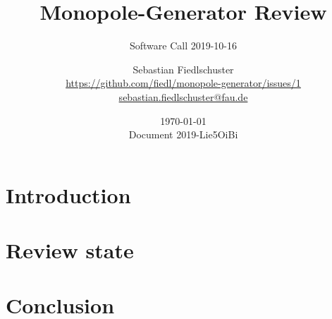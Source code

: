 \documentclass[green, 12pt]{beamer}
\title[Monopole-Generator Review, \url{https://github.com/fiedl/monopole-generator/issues/1}]{Monopole-Generator Review}
\subtitle{Software Call 2019-10-16}
\date{\today \\ \vspace*{2mm} \tiny{Document 2019-Lie5OiBi} \normalsize}
\author[Sebastian Fiedlschuster]{Sebastian Fiedlschuster \\ \small\url{https://github.com/fiedl/monopole-generator/issues/1} \\ \small\url{sebastian.fiedlschuster@fau.de}}
\institute{Erlangen Centre for Astroparticle Physics}
\newif\ifplacelogo %
\begin{document}



\placelogofalse

\section{Introduction}


\section{Review state}


\section{Conclusion}


\end{document}
